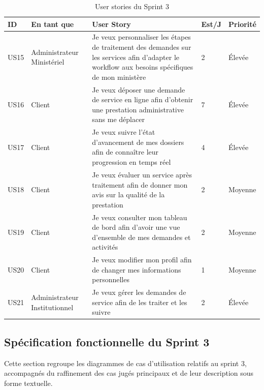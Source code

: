 \begin{table}[H]
    \centering
    \begin{tabular}{ |p{1cm}|p{3cm}|p{7cm}|p{1cm}|p{2cm}|} \hline
    \rowcolor{orange!30}
    \textbf{ID} & \textbf{En tant que} & \textbf{User Story} & \textbf{Est/J} & \textbf{Priorité} \\ \hline
    
    US15 & Administrateur Ministériel & Je veux personnaliser les étapes de traitement des demandes sur les services afin d’adapter le workflow aux besoins spécifiques de mon ministère & 2 & Élevée \\ \hline

    US16 & Client & Je veux déposer une demande de service en ligne afin d'obtenir une prestation administrative sans me déplacer & 7 & Élevée \\ \hline

    US17 & Client & Je veux suivre l'état d'avancement de mes dossiers afin de connaître leur progression en temps réel & 4 & Élevée \\ \hline

    US18 & Client & Je veux évaluer un service après traitement afin de donner mon avis sur la qualité de la prestation & 2 & Moyenne \\ \hline

    US19 & Client & Je veux consulter mon tableau de bord afin d’avoir une vue d’ensemble de mes demandes et activités & 2 & Moyenne \\ \hline

    US20 & Client & Je veux modifier mon profil afin de changer mes informations personnelles & 1 & Moyenne \\ \hline

    US21 & Administrateur Institutionnel & Je veux gérer les demandes de service afin de les traiter et les suivre & 2 & Élevée \\ \hline

    \end{tabular}
    \caption{User stories du Sprint 3}
    \label{tab:user-stories-sprint3}
\end{table}

\subsection{Spécification fonctionnelle du Sprint 3}

Cette section regroupe les diagrammes de cas d'utilisation relatifs au sprint 3, accompagnés du raffinement des cas jugés principaux et de leur description sous forme textuelle.

